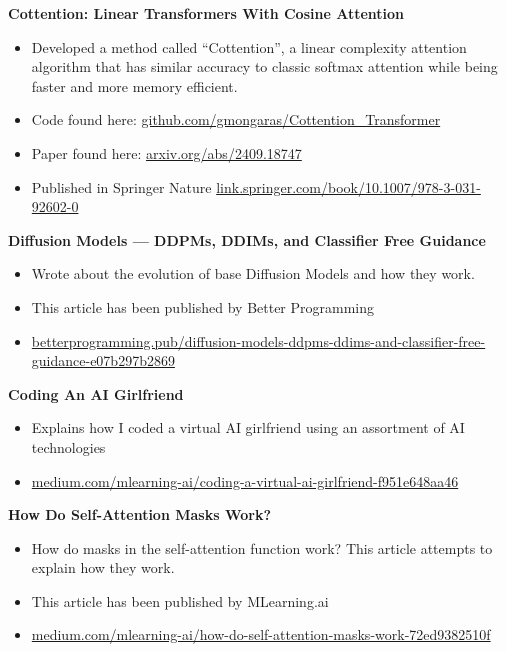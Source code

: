 \documentclass[a4paper,10pt]{article}
\begin{document}
\noindent\textbf{Cottention: Linear Transformers With Cosine Attention}
\begin{itemize}[noitemsep,topsep=0pt]
  \item Developed a method called “Cottention”, a linear complexity attention algorithm that has similar accuracy to classic softmax attention while being faster and more memory efficient.
  \item Code found here: \href{https://github.com/gmongaras/Cottention_Transformer}{github.com/gmongaras/Cottention\_Transformer}
  \item Paper found here: \href{https://arxiv.org/abs/2409.18747}{arxiv.org/abs/2409.18747}
  \item Published in Springer Nature \href{https://link.springer.com/book/10.1007/978-3-031-92602-0?sap-outbound-id=AD9F926E0AA16D13049BD2370EAFCAD37B0D3F1F}{link.springer.com/book/10.1007/978-3-031-92602-0}
\end{itemize}

\noindent\textbf{Diffusion Models — DDPMs, DDIMs, and Classifier Free Guidance}
\begin{itemize}[noitemsep,topsep=0pt]
  \item Wrote about the evolution of base Diffusion Models and how they work.
  \item This article has been published by Better Programming
  \item \href{https://betterprogramming.pub/diffusion-models-ddpms-ddims-and-classifier-free-guidance-e07b297b2869}{betterprogramming.pub/diffusion-models-ddpms-ddims-and-classifier-free-guidance-e07b297b2869}
\end{itemize}

\noindent\textbf{Coding An AI Girlfriend}
\begin{itemize}[noitemsep,topsep=0pt]
  \item Explains how I coded a virtual AI girlfriend using an assortment of AI technologies
  \item \href{https://medium.com/mlearning-ai/coding-a-virtual-ai-girlfriend-f951e648aa46}{medium.com/mlearning-ai/coding-a-virtual-ai-girlfriend-f951e648aa46}
\end{itemize}

\noindent\textbf{How Do Self-Attention Masks Work?}
\begin{itemize}[noitemsep,topsep=0pt]
  \item How do masks in the self-attention function work? This article attempts to explain how they work.
  \item This article has been published by MLearning.ai
  \item \href{https://medium.com/mlearning-ai/how-do-self-attention-masks-work-72ed9382510f}{medium.com/mlearning-ai/how-do-self-attention-masks-work-72ed9382510f}
\end{itemize}
\end{document}
